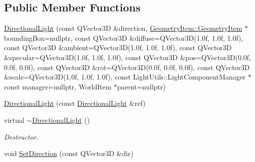 \subsection*{Public Member Functions}
\begin{DoxyCompactItemize}
\item 
\mbox{\hyperlink{class_geometry_engine_1_1_geometry_world_item_1_1_geometry_light_1_1_directional_light_ac85f53b0abb002ec8406755b9177cf53}{Directional\+Light}} (const Q\+Vector3D \&direction, \mbox{\hyperlink{class_geometry_engine_1_1_geometry_world_item_1_1_geometry_item_1_1_geometry_item}{Geometry\+Item\+::\+Geometry\+Item}} $\ast$bounding\+Box=nullptr, const Q\+Vector3D \&diffuse=Q\+Vector3D(1.\+0f, 1.\+0f, 1.\+0f), const Q\+Vector3\+D \&ambient=\+Q\+Vector3\+D(1.\+0f, 1.\+0f, 1.\+0f), const Q\+Vector3\+D \&specular=\+Q\+Vector3\+D(1.\+0f, 1.\+0f, 1.\+0f), const Q\+Vector3\+D \&pos=\+Q\+Vector3\+D(0.\+0f, 0.\+0f, 0.\+0f), const Q\+Vector3\+D \&rot=\+Q\+Vector3\+D(0.\+0f, 0.\+0f, 0.\+0f), const Q\+Vector3\+D \&scale=\+Q\+Vector3\+D(1.\+0f, 1.\+0f, 1.\+0f), const Light\+Utils\+::\+Light\+Component\+Manager $\ast$const manager=nullptr, World\+Item $\ast$parent=nullptr)
\item 
\mbox{\hyperlink{class_geometry_engine_1_1_geometry_world_item_1_1_geometry_light_1_1_directional_light_a51bac310074f6315122e23c2d9e28d6f}{Directional\+Light}} (const \mbox{\hyperlink{class_geometry_engine_1_1_geometry_world_item_1_1_geometry_light_1_1_directional_light}{Directional\+Light}} \&ref)
\item 
\mbox{\label{class_geometry_engine_1_1_geometry_world_item_1_1_geometry_light_1_1_directional_light_a3f337a552f7d5700e2149fce03e4fbf1}} 
virtual \mbox{\hyperlink{class_geometry_engine_1_1_geometry_world_item_1_1_geometry_light_1_1_directional_light_a3f337a552f7d5700e2149fce03e4fbf1}{$\sim$\+Directional\+Light}} ()
\begin{DoxyCompactList}\small\item\em Destructor. \end{DoxyCompactList}\item 
\mbox{\label{class_geometry_engine_1_1_geometry_world_item_1_1_geometry_light_1_1_directional_light_a5cac3a371ef72b22c962a4432fa3afa3}} 
void \mbox{\hyperlink{class_geometry_engine_1_1_geometry_world_item_1_1_geometry_light_1_1_directional_light_a5cac3a371ef72b22c962a4432fa3afa3}{Set\+Direction}} (const Q\+Vector3D \&dir)

\end{DoxyCompactItemize}
